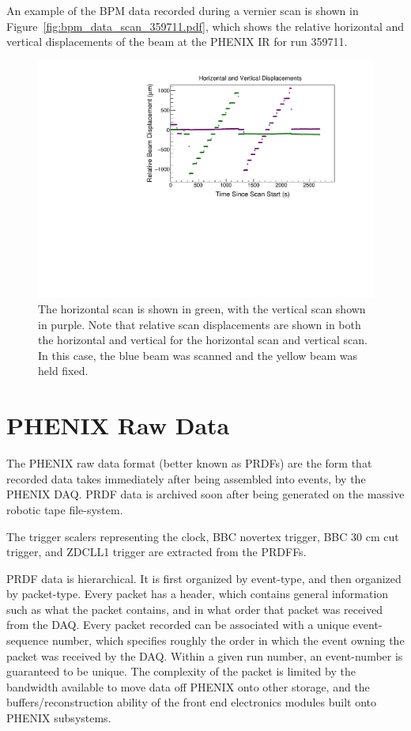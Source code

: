 An example of the BPM data recorded during a vernier scan is shown in
Figure~\ref{fig:bpm_data_scan_359711.pdf}, which shows the relative horizontal
and vertical displacements of the beam at the PHENIX IR for run 359711.

\begin{figure}[ht]
  \centering
  \includegraphics[width=0.8\linewidth]{./figures/bpm_data_scan_359711.pdf}
  \caption{
    The horizontal scan is shown in green, with the vertical scan shown in
    purple. Note that relative scan displacements are shown in both the
    horizontal and vertical for the horizontal scan and vertical scan. In this
    case, the blue beam was scanned and the yellow beam was held fixed.
  }
\end{figure}

\clearpage
\section{PHENIX Raw Data} 

The PHENIX raw data format (better known as PRDFs) are the form that recorded
data takes immediately after being assembled into events, by the PHENIX DAQ.
PRDF data is archived soon after being generated on the massive robotic tape
file-system. 

The trigger scalers representing the clock, BBC novertex trigger, BBC 30 cm
cut trigger, and ZDCLL1 trigger are extracted from the PRDFFs.

PRDF data is hierarchical. It is first organized by event-type, and then
organized by packet-type.  Every packet has a header, which contains general
information such as what the packet contains, and in what order that packet was
received from the DAQ. Every packet recorded can be associated with a unique
event-sequence number, which specifies roughly the order in which the event
owning the packet was received by the DAQ. Within a given run number, an
event-number is guaranteed to be unique. The complexity of the packet is limited
by the bandwidth available to move data off PHENIX onto other storage, and the
buffers/reconstruction ability of the front end electronics modules built onto
PHENIX subsystems.

